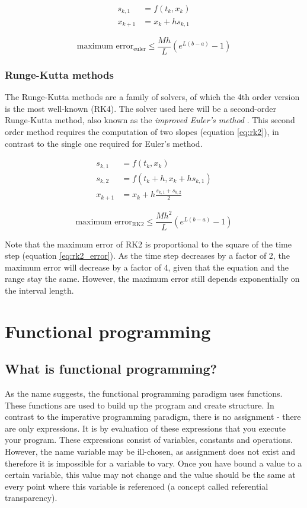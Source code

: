 \begin{align}
	\label{eq:euler}
	s_{k,1} &= f(t_{k},x_{k}) \\
	x_{k+1} &= x_{k} + h s_{k,1} \nonumber
\end{align}

\begin{equation}
\label{eq:euler_error}
\text{maximum error}_{\text{euler}} \leq \frac{M h}{L} (e^{L(b-a)} -1)
\end{equation}

\subsubsection{Runge-Kutta methods}
The Runge-Kutta methods are a family of solvers, of which the 4th order version is the most well-known (RK4). The solver used here will be a second-order Runge-Kutta method, also known as the \emph{improved Euler's method} \cite{DE}. This second order method requires the computation of two slopes (equation \ref{eq:rk2}), in contrast to the single one required for Euler's method.

\begin{align}
	\label{eq:rk2}
	s_{k,1} &= f(t_{k},x_{k}) \\
	s_{k,2} &= f(t_{k} + h,x_{k} + h s_{k,1}) \nonumber \\
	x_{k+1} &= x_{k} + h \frac{s_{k,1} + s_{k,2}}{2} \nonumber
\end{align}

\begin{equation}
\label{eq:rk2_error}
\text{maximum error}_{\text{RK2}} \leq \frac{M h^{2}}{L} (e^{L(b-a)} -1)
\end{equation}

Note that the maximum error of RK2 is proportional to the square of the time step (equation \ref{eq:rk2_error}). As the time step decreases by a factor of 2, the maximum error will decrease by a factor of 4, given that the equation and the range stay the same. However, the maximum error still depends exponentially on the interval length.


\section{Functional programming}
\lstset{style=haskellStyle}
\subsection{What is functional programming?}
As the name suggests, the functional programming paradigm uses functions. These functions are used to build up the program and create structure. In contrast to the imperative programming paradigm, there is no assignment - there are only expressions. It is by evaluation of these expressions that you execute your program. These expressions consist of variables, constants and operations. However, the name variable may be ill-chosen, as assignment does not exist and therefore it is impossible for a variable to vary. Once you have bound a value to a certain variable, this value may not change and the value should be the same at every point where this variable is referenced (a concept called referential transparency). 

